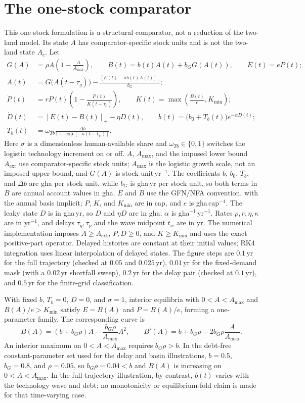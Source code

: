 \documentclass[11pt,a4paper]{article}
\newcommand{\pos}[1]{\left[#1\right]_+}
\begin{document}
\section{The one-stock comparator}\label{si:onestock}

This one-stock formulation is a structural comparator, not a reduction of the two-land model. Its state $A$ has comparator-specific stock units and is not the two-land state $A_c$. Let
\begin{align*}
G(A)&=\rho A\left(1-\frac{A}{A_{\max}}\right),\qquad
B(t)=b(t)A(t)+b_GG(A(t)),\qquad E(t)=eP(t);\\
\dot A(t)&=G\bigl(A(t-\tau_g)\bigr)-\frac{\pos{E(t)-\sigma b(t)A(t)}}{b_G};\\
\dot P(t)&=rP(t)\left(1-\frac{P(t)}{K(t-\tau_p)}\right),\qquad
K(t)=\max\!\left(\frac{B(t)}{e},K_{\min}\right);\\
\dot D(t)&=\pos{E(t)-B(t)}-\eta D(t),\qquad
b(t)=\bigl(b_0+T_b(t)\bigr)e^{-\alpha D(t)};\\
T_b(t)&=\omega_{Tb}\frac{\Delta b}{1+\exp[-\kappa(t-t_w)]}.
\end{align*}
Here $\sigma$ is a dimensionless human-available share and $\omega_{Tb}\in\{0,1\}$ switches the logistic technology increment on or off. $A$, $A_{\max}$, and the imposed lower bound $A_{\mathrm{ext}}$ use comparator-specific stock units; $A_{\max}$ is the logistic growth scale, not an imposed upper bound, and $G(A)$ is stock-unit\,yr$^{-1}$.  The coefficients $b$, $b_0$, $T_b$, and $\Delta b$ are gha per stock unit, while $b_G$ is gha\,yr per stock unit, so both terms in $B$ are annual account values in gha. $E$ and $B$ use the GFN/NFA convention, with the annual basis implicit; $P$, $K$, and $K_{\min}$ are in cap, and $e$ is gha\,cap$^{-1}$. The leaky state $D$ is in gha\,yr, so $\dot D$ and $\eta D$ are in gha; $\alpha$ is gha$^{-1}$\,yr$^{-1}$. Rates $\rho,r,\eta,\kappa$ are in yr$^{-1}$, and delays $\tau_g,\tau_p$ and the wave midpoint $t_w$ are in yr. The numerical implementation imposes $A\ge A_{\mathrm{ext}}$, $P,D\ge0$, and $K\ge K_{\min}$ and uses the exact positive-part operator. Delayed histories are constant at their initial values; RK4 integration uses linear interpolation of delayed states. The figure steps are $0.1$\,yr for the full trajectory (checked at $0.05$ and $0.025$\,yr), $0.01$\,yr for the fixed-demand mask (with a $0.02$\,yr shortfall sweep), $0.2$\,yr for the delay pair (checked at $0.1$\,yr), and $0.5$\,yr for the finite-grid classification.

With fixed $b$, $T_b=0$, $D=0$, and $\sigma=1$, interior equilibria with $0<A<A_{\max}$ and $B(A)/e>K_{\min}$ satisfy $E=B(A)$ and $P=B(A)/e$, forming a one-parameter family. The corresponding curve is
\[
B(A)=(b+b_G\rho)A-\frac{b_G\rho}{A_{\max}}A^2,\qquad
B'(A)=b+b_G\rho-2b_G\rho\frac{A}{A_{\max}}.
\]
An interior maximum on $0<A<A_{\max}$ requires $b_G\rho>b$. In the debt-free constant-parameter set used for the delay and basin illustrations, $b=0.5$, $b_G=0.8$, and $\rho=0.05$, so $b_G\rho=0.04<b$ and $B(A)$ is increasing on $0<A<A_{\max}$. In the full-trajectory illustration, by contrast, $b(t)$ varies with the technology wave and debt; no monotonicity or equilibrium-fold claim is made for that time-varying case.
\end{document}
